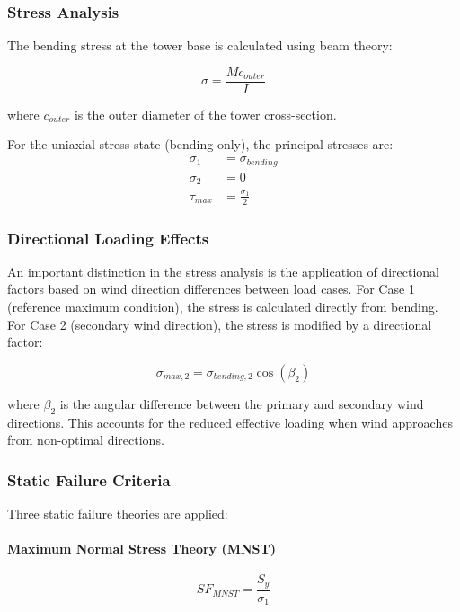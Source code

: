 \documentclass[11pt]{article}
\begin{document}
\subsubsection{Stress Analysis}

The bending stress at the tower base is calculated using beam theory:

\begin{equation}
\sigma = \frac{Mc_{outer}}{I}
\end{equation}

where $c_{outer}$ is the outer diameter of the tower cross-section.

For the uniaxial stress state (bending only), the principal stresses are:
\begin{align}
\sigma_1 &= \sigma_{bending} \\
\sigma_2 &= 0 \\
\tau_{max} &= \frac{\sigma_1}{2}
\end{align}

\subsubsection{Directional Loading Effects}

An important distinction in the stress analysis is the application of directional factors based on wind direction differences between load cases. For Case 1 (reference maximum condition), the stress is calculated directly from bending. For Case 2 (secondary wind direction), the stress is modified by a directional factor:

\begin{equation}
\sigma_{max,2} = \sigma_{bending,2} \cos(\beta_2)
\end{equation}

where $\beta_2$ is the angular difference between the primary and secondary wind directions. This accounts for the reduced effective loading when wind approaches from non-optimal directions.

\subsubsection{Static Failure Criteria}

Three static failure theories are applied:

\paragraph{Maximum Normal Stress Theory (MNST)}
\begin{equation}
SF_{MNST} = \frac{S_y}{\sigma_1}
\end{equation}
\end{document}
